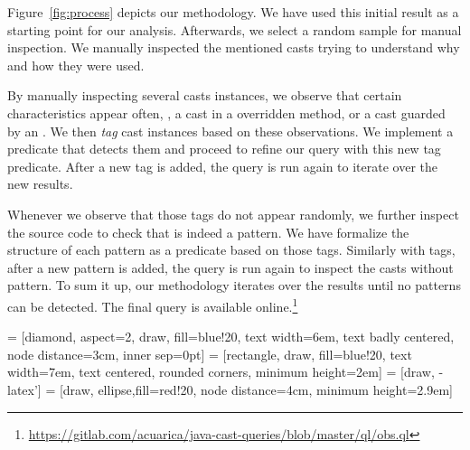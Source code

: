 Figure~\ref{fig:process} depicts our methodology.
We have used this initial result as a starting point for our analysis.
Afterwards, we select a random sample for manual inspection.
We manually inspected the mentioned casts trying to understand why and how they were used.

By manually inspecting several casts instances, we observe that certain characteristics appear often, \eg{}, a cast in a overridden method, or a cast guarded by an .
We then \emph{tag} cast instances based on these observations.
We implement a \ql{} predicate that detects them and proceed to refine our query with this new tag predicate.
After a new tag is added, the query is run again to iterate over the new results.

Whenever we observe that those tags do not appear randomly, we further inspect the source code to check that is indeed a pattern.
We have formalize the structure of each pattern as a \ql{} predicate based on those tags.
Similarly with tags, after a new pattern is added, the query is run again to inspect the casts without pattern.
To sum it up, our methodology iterates over the results until no patterns can be detected.
The final \ql{} query is available online.\footnote{\url{https://gitlab.com/acuarica/java-cast-queries/blob/master/ql/obs.ql}}

 = [diamond, aspect=2, draw, fill=blue!20, 
    text width=6em, text badly centered, node distance=3cm, inner sep=0pt]
 = [rectangle, draw, fill=blue!20, 
    text width=7em, text centered, rounded corners, minimum height=2em]
 = [draw, -latex']
 = [draw, ellipse,fill=red!20, node distance=4cm,
    minimum height=2.9em]

